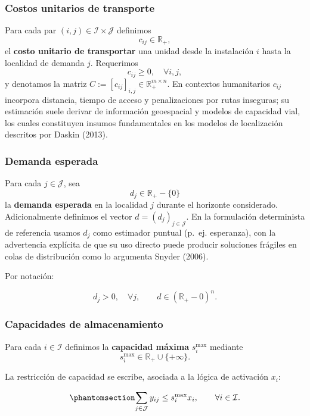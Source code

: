 \documentclass[
  spanish,
  us-letterpaper,
]{scrreprt}
\numberwithin{equation}{section}
\begin{document}
\subsubsection{Costos unitarios de
transporte}\label{costos-unitarios-de-transporte}

Para cada par \((i,j)\in\mathcal{I}\times\mathcal{J}\) definimos \[
c_{ij}\in\mathbb{R}_{+},
\] el \textbf{costo unitario de transportar} una unidad desde la
instalación \(i\) hasta la localidad de demanda \(j\). Requerimos \[
c_{ij}\ge 0,\quad \forall i,j,
\] y denotamos la matriz
\(C:=[c_{ij}]_{i,j}\in\mathbb{R}_+^{m\times n}\). En contextos
humanitarios \(c_{ij}\) incorpora distancia, tiempo de acceso y
penalizaciones por rutas inseguras; su estimación suele derivar de
información geoespacial y modelos de capacidad vial, los cuales
constituyen insumos fundamentales en los modelos de localización
descritos por Daskin (2013).

\subsubsection{Demanda esperada}\label{demanda-esperada}

Para cada \(j\in\mathcal{J}\), sea \[
d_j\in\mathbb{R}_{+}-\{0\}
\] la \textbf{demanda esperada} en la localidad \(j\) durante el
horizonte considerado. Adicionalmente definimos el vector
\(d=(d_j)_{j\in\mathcal{J}}\). En la formulación determinista de
referencia usamos \(d_j\) como estimador puntual (p.~ej. esperanza), con
la advertencia explícita de que su uso directo puede producir soluciones
frágiles en colas de distribución como lo argumenta Snyder (2006).

Por notación:

\[
d_j>0,\quad \forall j,\qquad d\in(\mathbb{R}_{+}-{0})^n.
\]

\subsubsection{Capacidades de
almacenamiento}\label{capacidades-de-almacenamiento}

Para cada \(i\in\mathcal{I}\) definimos la \textbf{capacidad máxima}
\(s_i^{\max}\) mediante \[
s_i^{\max}\in\mathbb{R}_{+}\cup\{+\infty\}.
\]

La restricción de capacidad se escribe, asociada a la lógica de
activación \(x_i\):

\begin{equation}\phantomsection\label{eq-capacidad-smax}{
\sum_{j\in\mathcal{J}} y_{ij} \le s_i^{\max} x_i,\qquad \forall i\in\mathcal{I}.
}\end{equation}
\end{document}
